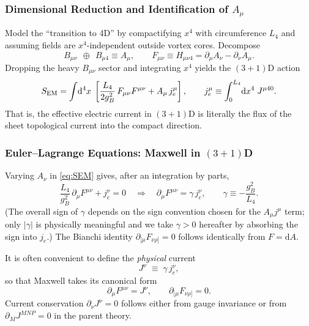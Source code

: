 \subsubsection{Dimensional Reduction and Identification of $A_\mu$}
Model the ``transition to 4D'' by compactifying $x^4$ with circumference $L_4$ and assuming fields are $x^4$-independent outside vortex cores. Decompose
\begin{equation}
B_{\mu\nu}\ \ \oplus\ \ B_{\mu 4}\equiv A_\mu,
\qquad
F_{\mu\nu}\equiv H_{\mu\nu 4}=\partial_\mu A_\nu-\partial_\nu A_\mu.
\end{equation}
Dropping the heavy $B_{\mu\nu}$ sector and integrating $x^4$ yields the $(3{+}1)$D action
\begin{equation}
S_{\rm EM}=\int\!\mathrm d^{4}x\;\left[\frac{L_4}{2g_B^2}\,F_{\mu\nu}F^{\mu\nu}
+ A_\mu\, j_e^\mu\right],
\qquad
j_e^\mu \equiv \int_0^{L_4}\! \mathrm dx^4\;J^{\mu 4 0}.
\label{eq:SEM}
\end{equation}
That is, the effective electric current in $(3{+}1)$D is literally the flux of the sheet topological current into the compact direction.

\subsubsection{Euler--Lagrange Equations: Maxwell in $(3{+}1)$D}
Varying $A_\nu$ in \eqref{eq:SEM} gives, after an integration by parts,
\begin{equation}
\frac{L_4}{g_B^2}\,\partial_\mu F^{\mu\nu}+ j_e^\nu=0
\quad\Longrightarrow\quad
\partial_\mu F^{\mu\nu}=\gamma\, j_e^\nu,\qquad
\gamma\equiv -\frac{g_B^2}{L_4}.
\label{eq:maxwell-gamma}
\end{equation}
(The overall sign of $\gamma$ depends on the sign convention chosen for the $A_\mu j^\mu$ term; only $|\gamma|$ is physically meaningful and we take $\gamma>0$ hereafter by absorbing the sign into $j_e$.) The Bianchi identity $\partial_{[\mu}F_{\nu\rho]}=0$ follows identically from $F=\mathrm dA$.

It is often convenient to define the \emph{physical} current
\begin{equation}
J^\nu \;\equiv\; \gamma\, j_e^\nu,
\end{equation}
so that Maxwell takes its canonical form
\begin{equation}
\partial_\mu F^{\mu\nu}=J^\nu,\qquad \partial_{[\mu}F_{\nu\rho]}=0.
\end{equation}
Current conservation $\partial_\nu J^\nu=0$ follows either from gauge invariance or from $\partial_M J^{MNP}=0$ in the parent theory.

